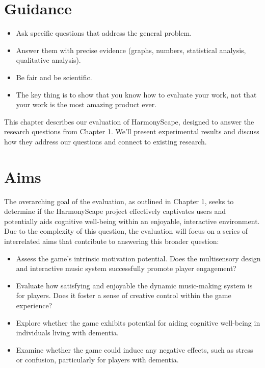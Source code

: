 \documentclass{l4proj}
\begin{document}
\section{Guidance}
\begin{itemize}
    \item
        Ask specific questions that address the general problem.
    \item
        Answer them with precise evidence (graphs, numbers, statistical
        analysis, qualitative analysis).
    \item
        Be fair and be scientific.
    \item
        The key thing is to show that you know how to evaluate your work, not
        that your work is the most amazing product ever.
\end{itemize}
\newpage

This chapter describes our evaluation of HarmonyScape, designed to answer the research questions from Chapter 1. We'll present experimental results and discuss how they address our questions and connect to existing research.

\section{Aims}
The overarching goal of the evaluation, as outlined in Chapter 1, seeks to determine if the HarmonyScape project effectively captivates users and potentially aids cognitive well-being within an enjoyable, interactive environment. Due to the complexity of this question, the evaluation will focus on a series of interrelated aims that contribute to answering this broader question:

\begin{itemize}
    \item Assess the game's intrinsic motivation potential. Does the multisensory design and interactive music system successfully promote player engagement?
    \item Evaluate how satisfying and enjoyable the dynamic music-making system is for players. Does it foster a sense of creative control within the game experience?
    \item Explore whether the game exhibits potential for aiding cognitive well-being in individuals living with dementia.
    \item Examine whether the game could induce any negative effects, such as stress or confusion, particularly for players with dementia.
\end{itemize}
\end{document}
